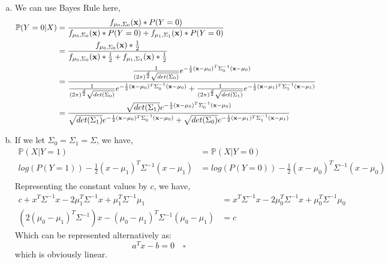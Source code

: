 \documentclass[11pt,french,english]{article}
\begin{document}
\begin{enumerate}
\begin{enumerate}[(a)]
    \item We can use Bayes Rule here,
    \begin{align*}
        \mathbb{P}(Y=0|X) &= \frac{f_{\mu_{0},\Sigma_{0}}(\mathbf{x})*P(Y=0)}{f_{\mu_{0},\Sigma_{0}}(\mathbf{x})*P(Y=0) + f_{\mu_{1},\Sigma_{1}}(\mathbf{x})*P(Y=0)} \\
        &= \frac{f_{\mu_{0},\Sigma_{0}}(\mathbf{x})*\frac{1}{2}}{f_{\mu_{0},\Sigma_{0}}(\mathbf{x})*\frac{1}{2} + f_{\mu_{1},\Sigma_{1}}(\mathbf{x})*\frac{1}{2}} \\
        &= \frac{\frac{1}{(2\pi)^{\frac{d}{2}}\sqrt{det(\Sigma_{0})}}e^{-\frac{1}{2}(\mathbf{x}-\mu_{0})^{T}\Sigma_{0}^{-1}(\mathbf{x}-\mu_{0})}}{\frac{1}{(2\pi)^{\frac{d}{2}}\sqrt{det(\Sigma_{0})}}e^{-\frac{1}{2}(\mathbf{x}-\mu_{0})^{T}\Sigma_{0}^{-1}(\mathbf{x}-\mu_{0})} + \frac{1}{(2\pi)^{\frac{d}{2}}\sqrt{det(\Sigma_{1})}}e^{-\frac{1}{2}(\mathbf{x}-\mu_{1})^{T}\Sigma_{1}^{-1}(\mathbf{x}-\mu_{1})}}\\
        &= \frac{\sqrt{det(\Sigma_{1})}e^{-\frac{1}{2}(\mathbf{x}-\mu_{0})^{T}\Sigma_{0}^{-1}(\mathbf{x}-\mu_{0})}}{\sqrt{det(\Sigma_{1})}e^{-\frac{1}{2}(\mathbf{x}-\mu_{0})^{T}\Sigma_{0}^{-1}(\mathbf{x}-\mu_{0})} + \sqrt{det(\Sigma_{0})}e^{-\frac{1}{2}(\mathbf{x}-\mu_{1})^{T}\Sigma_{1}^{-1}(\mathbf{x}-\mu_{1})}}
    \end{align*}
    \item If we let $\Sigma_0=\Sigma_1=\Sigma$, we have, 
    \begin{align*}
        \mathbb{P}(X|Y=1) &= \mathbb{P}(X|Y=0) \\
        log(P(Y=1)) - \frac{1}{2}(x-\mu_1)^T\Sigma^{-1}(x-\mu_1) &= log(P(Y=0)) - \frac{1}{2}(x-\mu_0)^T\Sigma^{-1}(x-\mu_0) \\
    \end{align*}
    Representing the constant values by $c$, we have,
    \begin{align*}
        c + x^T\Sigma^{-1}x - 2\mu_1^T\Sigma^{-1}x + \mu_1^T\Sigma^{-1}\mu_1 &= x^T\Sigma^{-1}x - 2\mu_0^T\Sigma^{-1}x + \mu_0^T\Sigma^{-1}\mu_0 \\
        \left(2(\mu_0 - \mu_1)^T\Sigma^{-1}\right)x - (\mu_0 - \mu_1)^T\Sigma^{-1}(\mu_0 - \mu_1) &= c
    \end{align*}
    Which can be represented alternatively as: $$
    a^Tx - b = 0  \quad \square$$ which is obviously linear.
\end{enumerate}

\end{enumerate}

\end{document}
